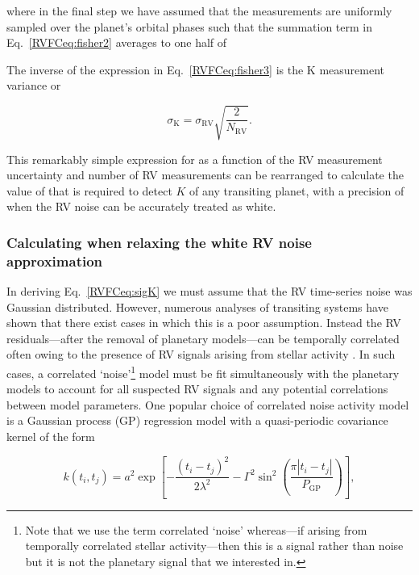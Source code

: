\noindent where in the final step we have assumed 
that the \nrv{} measurements are uniformly sampled
over the planet's orbital phases such that the summation term in Eq.~\ref{RVFCeq:fisher2} averages to one
half of 

The inverse of the expression in Eq.~\ref{RVFCeq:fisher3} is the K measurement variance or

\begin{equation}
  \sigma_{\text{K}} = \sigma_{\text{RV}} \sqrt{\frac{2}{N_{\text{RV}}}}.
  \label{RVFCeq:sigK}
\end{equation}

\noindent This remarkably simple expression for \sigK{} as a function
of the RV measurement uncertainty and number of RV measurements 
can be rearranged to calculate the value of \nrv{} that is
required to detect $K$ of any transiting planet, with a precision of \sigK{,} when the RV noise
can be accurately treated as white.

\subsubsection{Calculating \sigK{} when relaxing the white RV noise approximation} \label{RVFCsect:fisherGP}
In deriving Eq.~\ref{RVFCeq:sigK} we must assume that the RV time-series noise was Gaussian
distributed. However, numerous analyses of transiting systems have shown that there exist cases in which this is
a poor assumption. Instead the RV residuals---after the removal of planetary models---can be temporally correlated
often owing to the presence of RV signals arising from stellar activity
\citep[e.g.][]{haywood14, grunblatt15, lopezmorales16, cloutier17b, dittmann17}. In
such cases, a correlated `noise'\footnote{Note that we use the term correlated `noise' whereas---if arising
  from temporally correlated stellar activity---then this is a signal rather than noise but it is not the planetary
  signal that we interested in.}
model must be fit simultaneously with the planetary models to account for all suspected
RV signals and any potential correlations between model parameters. One popular choice of
correlated noise activity model is a Gaussian process (GP) regression model with a quasi-periodic covariance kernel
of the form

\begin{equation}
  k(t_i,t_j) = a^2 \exp{\left[ -\frac{(t_i-t_j)^2}{2 \lambda^2}
      -\Gamma^2 \sin^2{\left(\frac{\pi |t_i-t_j|}{P_{\text{GP}}} \right)} \right]},
  \label{RVFCeq:kernel}
\end{equation}

